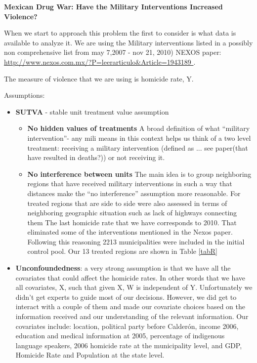 \documentclass{article}[11 pt]
\begin{document}
\begin{center}	
	\textbf{Mexican Drug War: Have the Military Interventions Increased Violence?}
\end{center}

When we start to approach this problem the first to consider is what data is available to analyze it. We are using the Military interventions listed in a possibly non comprehensive list from may 7,2007 - nov 21, 2010) NEXOS paper: \url{http://www.nexos.com.mx/?P=leerarticulo&Article=1943189 }. %

The measure of violence that we are using is homicide rate, Y.

Assumptions:
		\begin{itemize}
		\item \textbf{SUTVA} - stable unit treatment value assumption
		\begin{itemize}
			\item \textbf{No hidden values of treatments} A broad definition of what ``military intervention''- any mili means in this context helps us think of a two level treatment: receiving a military intervention (defined as ... see paper(that have resulted in deaths?)) or not receiving it.
			\item \textbf{No interference between units} The main idea is to group neighboring regions that have received military interventions in such a way that distances make the ``no interference'' assumption  more reasonable. For treated regions that are side to side were also assessed in terms of neighboring  geographic situation such as lack of highways connecting them %
	The last homicide rate that we have corresponds to 2010. That eliminated some of the interventions mentioned in the Nexos paper. 
	Following this reasoning 2213 municipalities were included in the initial control pool. Our 13 treated regions are shown in Table \ref{tabR}
		\end{itemize}
			\item \textbf{Unconfoundedness}: a very strong assumption is that we have all the covariates that could affect the homicide rates. In other words that we have all covariates, X, such that given X,  W is independent of Y. Unfortunately we didn't get experts to guide most of our decisions. However, we did get to interact with a couple of them and made our covariate choices based on the information received and our understanding of the relevant information. Our covariates include: location, political party before Calder\'{o}n, income 2006, education and medical information at 2005, percentage of indigenous language speakers, 2006 homicide rate at the municipality level, and GDP, Homicide Rate and Population at the state level.

\end{itemize}
\end{document}
